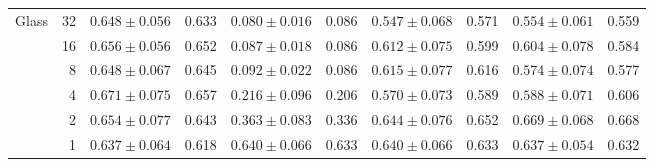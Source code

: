 \begin{table}[t]
\begin{tabular}{lrcrcrcrcr}
\midrule
Glass & 32 & $0.648 \pm 0.056$ & 0.633 & $0.080 \pm 0.016$ & 0.086 & $0.547 \pm 0.068$ & 0.571 & $0.554 \pm 0.061$ & 0.559 \\
 & 16 & $0.656 \pm 0.056$ & 0.652 & $0.087 \pm 0.018$ & 0.086 & $0.612 \pm 0.075$ & 0.599 & $0.604 \pm 0.078$ & 0.584 \\
 & 8 & $0.648 \pm 0.067$ & 0.645 & $0.092 \pm 0.022$ & 0.086 & $0.615 \pm 0.077$ & 0.616 & $0.574 \pm 0.074$ & 0.577 \\
 & 4 & $0.671 \pm 0.075$ & 0.657 & $0.216 \pm 0.096$ & 0.206 & $0.570 \pm 0.073$ & 0.589 & $0.588 \pm 0.071$ & 0.606 \\
 & 2 & $0.654 \pm 0.077$ & 0.643 & $0.363 \pm 0.083$ & 0.336 & $0.644 \pm 0.076$ & 0.652 & $0.669 \pm 0.068$ & 0.668 \\
 & 1 & $0.637 \pm 0.064$ & 0.618 & $0.640 \pm 0.066$ & 0.633 & $0.640 \pm 0.066$ & 0.633 & $0.637 \pm 0.054$ & 0.632 \\
\bottomrule
\end{tabular}
\end{table}
